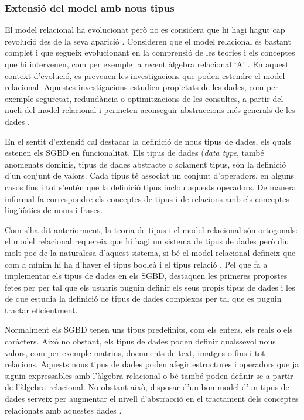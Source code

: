 \subsubsection{Extensió del model amb nous tipus}
\label{sec:art:relacional-tipus}

El model relacional ha evolucionat però no es considera que hi hagi hagut
cap revolució des de la seva aparició
\parencite[cap.~19]{date06}. %
Consideren que el model relacional és bastant complet i que segueix
evolucionant en la comprensió de les teories i els conceptes que hi
intervenen, com per exemple la recent àlgebra relacional
`A' \parencite[\gls{apendix}~A]{date06:_datab_types_relat_model}.  En aquest
context d'evolució, es preveuen les investigacions que poden estendre
el model relacional. Aquestes investigacions estudien propietats de
les dades, com per exemple seguretat, redundància o optimitzacions de
les consultes, a partir del nucli del model relacional i permeten
aconseguir abstraccions més generals de les
dades \parencite[cap.~25]{date06}. %


En el sentit d'extensió cal destacar la definició de nous tipus de
dades, els quals estenen els \gls{SGBD} en funcionalitat.  Els tipus de
dades (\emph{data type}, també anomenats dominis, tipus de dades
abstracte o solament tipus, són la definició d'un conjunt de
valors. Cada tipus té associat un conjunt d'operadors, en alguns casos
fins i tot s'entén que la definició tipus inclou aquests operadors.
De manera informal \parencite{date04:introduction8} fa correspondre
els conceptes de tipus i de relacions amb els conceptes lingüístics de
noms i frases.


Com s'ha dit anteriorment, la teoria de tipus i el model relacional
són ortogonals: el model relacional requereix que hi hagi un sistema
de tipus de dades però diu molt poc de la naturalesa d'aquest sistema,
si bé el model relacional defineix que com a mínim hi ha d'haver el
tipus booleà i el tipus
relació \parencite{date:thethirdmanifesto}. 
Pel que fa a implementar
els tipus de dades en els \gls{SGBD}, destaquen les primeres propostes fetes per
\textcite{stonebraker86} per tal que els usuaris puguin definir els
seus propis tipus de dades i les de \textcite{seshadri98:_enhan} que
estudia la definició de tipus de dades complexos per tal que es puguin
tractar eficientment.


Normalment els \gls{SGBD} tenen uns tipus predefinits, com els enters, els
reals o els caràcters. Això no obstant, els tipus de dades poden
definir qualssevol nous valors, com per exemple matrius, documents de
text, imatges o fins i tot relacions.  Aquests nous tipus de dades
poden afegir estructures i operadors que ja siguin expressables amb
l'àlgebra relacional o bé també poden definir-se a partir de l'àlgebra
relacional. No obstant això, disposar d'un bon model d'un tipus de
dades serveix per augmentar el nivell d'abstracció en el tractament
dels conceptes relacionats amb aquestes dades
\parencite{date02:_tempor_data_relat_model}. %


